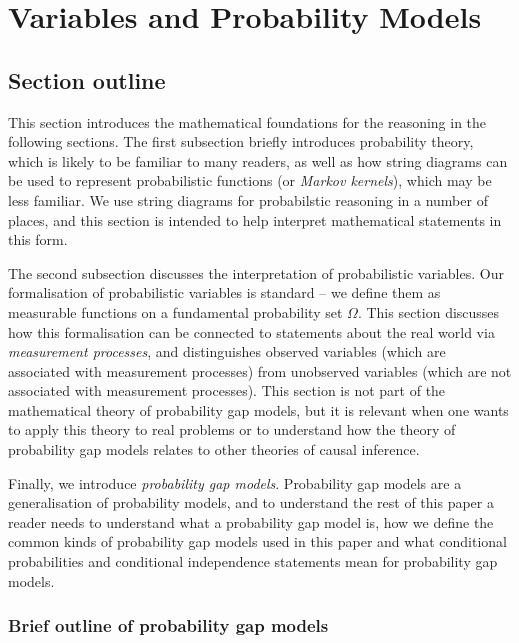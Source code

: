 

\section{Variables and Probability Models}\label{sec:vague_variables}

\subsection{Section outline}

This section introduces the mathematical foundations for the reasoning in the following sections. The first subsection briefly introduces probability theory, which is likely to be familiar to many readers, as well as how string diagrams can be used to represent probabilistic functions (or \emph{Markov kernels}), which may be less familiar. We use string diagrams for probabilstic reasoning in a number of places, and this section is intended to help interpret mathematical statements in this form.

The second subsection discusses the interpretation of probabilistic variables. Our formalisation of probabilistic variables is standard -- we define them as measurable functions on a fundamental probability set $\Omega$. This section discusses how this formalisation can be connected to statements about the real world via \emph{measurement processes}, and distinguishes observed variables (which are associated with measurement processes) from unobserved variables (which are not associated with measurement processes). This section is not part of the mathematical theory of probability gap models, but it is relevant when one wants to apply this theory to real problems or to understand how the theory of probability gap models relates to other theories of causal inference.

Finally, we introduce \emph{probability gap models}. Probability gap models are a generalisation of probability models, and to understand the rest of this paper a reader needs to understand what a probability gap model is, how we define the common kinds of probability gap models used in this paper and what conditional probabilities and conditional independence statements mean for probability gap models.

\subsubsection{Brief outline of probability gap models}

